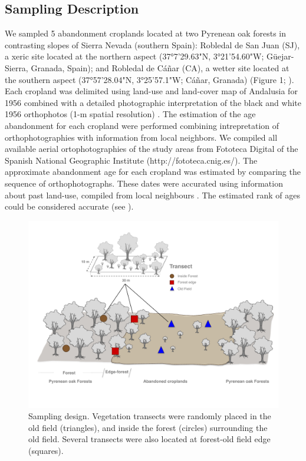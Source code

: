 \subsection{Sampling Description}\label{sec:coloniza:sampling}
We sampled 5 abandonment croplands located at two Pyrenean oak forests in contrasting slopes of Sierra Nevada (southern Spain): Robledal de San Juan (SJ), a xeric site located at the northern aspect (37°7'29.63"N, 3°21'54.60"W; Güejar-Sierra, Granada, Spain); and Robledal de Cáñar (CA), a wetter site located at the southern aspect (37°57'28.04"N, 3°25'57.1"W; Cáñar, Granada) (Figure 1; ). Each cropland was delimited using land-use and land-cover map of Andalusia for 1956 \autocites[][]{CMA2007MapaUsos} combined with a detailed photographic interpretation of the black and white 1956 orthophotos (1-m spatial resolution) \autocites[see][for more details]{NavarroGonzalezetal2012CartografiaHistorica}. The estimation of the age abandonment for each cropland were performed combining intrepretation of orthophotographies with information from local neighbors. We compiled all available aerial ortophotographies of the study areas from Fototeca Digital of the Spanish National Geographic Institute (http://fototeca.cnig.es/). The approximate abandonment age for each cropland was estimated by comparing the sequence of orthophotographs. These dates were accurated using information about past land-use, compiled from local neighbours \autocites[by local workshops and interviews with retired elder: farmers, shepherds and loggers; see details in ][]{MorenoLlorcaetal2014CaracterizacionFuentes,MorenoLlorcaetal2016HistoricalAnalysis}. The estimated rank of ages could be considered accurate (see ).

\begin{figure}
    \centering
    \includegraphics[width=\textwidth]{img/coloniza/coloniza-transectScheme.pdf}
    \caption{Sampling design. Vegetation transects were randomly placed in the old field (triangles), and inside the forest (circles) surrounding the old field. Several transects were also located at forest-old field edge (squares).}
    \label{fig:coloniza:transects}
\end{figure}

